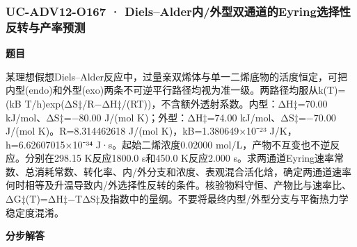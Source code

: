 \documentclass[UTF8,11pt,a4paper]{ctexart}
\begin{document}
\subsubsection*{UC-ADV12-O167 · Diels–Alder内/外型双通道的Eyring选择性反转与产率预测}
\noindent\textbf{题目}\par
某理想假想Diels–Alder反应中，过量亲双烯体与单一二烯底物的活度恒定，可把内型(endo)和外型(exo)两条不可逆平行路径均视为准一级。两路径均服从k(T)=(kB T/h)exp(ΔS‡/R−ΔH‡/(RT))，不含额外透射系数。内型：ΔH‡=70.00 kJ/mol、ΔS‡=−80.00 J/(mol K)；外型：ΔH‡=74.00 kJ/mol、ΔS‡=−70.00 J/(mol K)。R=8.314462618 J/(mol K)，kB=1.380649×10⁻²³ J/K，h=6.62607015×10⁻³⁴ J·s。起始二烯浓度0.02000 mol/L，产物不互变也不逆反应。分别在298.15 K反应1800.0 s和450.0 K反应2.000 s。求两通道Eyring速率常数、总消耗常数、转化率、内/外分支和浓度、表观混合活化焓，确定两通道速率何时相等及升温导致内/外选择性反转的条件。核验物料守恒、产物比与速率比、ΔG‡(T)=ΔH‡−TΔS‡及指数中的量纲。不要将最终内型/外型分支与平衡热力学稳定度混淆。\par
\medskip\noindent\textbf{分步解答}
\end{document}
